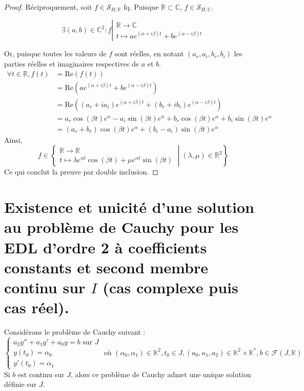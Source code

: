 \documentclass{article}
\newcommand{\Sol}{\mathcal S}
\renewcommand{\Re}{\text{Re}}
\newcommand{\C}{\mathbb C}
\newcommand{\R}{\mathbb R}
\begin{document}
\begin{proof}
	Réciproquement, soit $ f \in \Sol_{H ,\R}$ fq. Puisque $\R \subset \C$,  $ f \in \Sol_{H ,\C}$.
	
	$$
	\exists (a, b) \in \C^2 : f \left| \begin{array}{l}
    \R \to \C  \\
    t \mapsto a e^{(\alpha + i \beta) t}  + b e^{(\alpha - i \beta)t}
	\end{array}\right.$$

	Or, puisque toutes les valeurs de $f$ sont réelles, en notant $(a_r, a_i, b_r, b_i)$ les parties réelles et imaginaires respectives de $a$ et $b$.
	\begin{align*}
		\forall t \in \R, f(t) &= \Re(f(t)) \\
				&= \Re(a e^{(\alpha + i \beta) t}  + b e^{(\alpha - i \beta)t})\\
				&= \Re((a_r + i a_i) e^{(\alpha + i \beta) t}  + (b_r + i b_i) e^{(\alpha - i \beta)t})\\
			    &= a_r \cos(\beta t)e^\alpha - a_i\sin(\beta t)e^\alpha + b_r \cos(\beta t)e^\alpha + b_i \sin(\beta t) e^\alpha \\
			    &= (a_r + b_r) \cos(\beta t) e^\alpha + (b_i - a_i) \sin(\beta t) e^\alpha
	\end{align*}
	Ainsi,
	$$f\in \left\{ 
	\begin{array}{l}
    \R \to \R  \\
    t \mapsto \lambda e^{\alpha t } \cos (\beta t)   + \mu e^{\alpha t } \sin (\beta t)
  \end{array}
	\middle\vert  (\lambda, \mu) \in \R ^2 \right\}
$$
Ce qui conclut la preuve par double inclusion.
\end{proof}

\section{Existence et unicité d'une solution au problème de Cauchy pour les EDL d'ordre 2 à coefficients constants et second membre continu sur $I$ (cas complexe puis cas réel).}

Considérons le problème de Cauchy suivant :
$$\left\{ \begin{array}{l}
    a_{2}y''+a_{1}y'+a_{0}y = b \text{ sur } J  \\
    y(t_{0}) = \alpha_{0} \\
    y'(t_{0}) = \alpha_{1}
\end{array} \right. \text{ où } (\alpha_{0}, \alpha_{1}) \in \mathbb{K}^{2}, t_{0} \in J, (a_{0}, a_{1}, a_{2}) \in \mathbb{K}^{2} \times \mathbb{K}^{*}, b \in \mathcal{F}(J, \mathbb{K})$$
Si $b$ est continu sur $J$, alors ce problème de Cauchy admet une unique solution définie sur $J$.
\newline\newline
\end{document}
